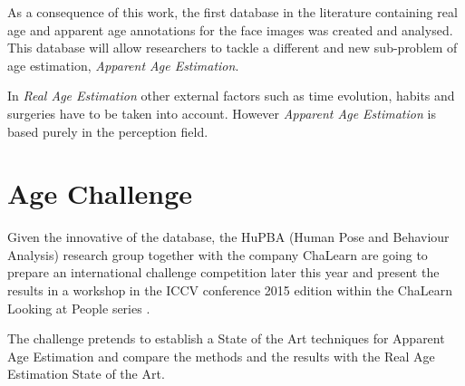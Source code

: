 As a consequence of this work, the first database in the literature containing real age and apparent age annotations for the face images was created and analysed. This database will allow researchers to tackle a different and new sub-problem of age estimation, \textit{Apparent Age Estimation}.

In \textit{Real Age Estimation} other external factors such as time evolution, habits and surgeries have to be taken into account. However \textit{Apparent Age Estimation} is based purely in the perception field.


\section{Age Challenge}

Given the innovative of the database, the HuPBA (Human Pose and Behaviour Analysis) research group \cite{HuPBA} together with the company ChaLearn \cite{ChaLearn} are going to prepare an international challenge competition later this year and present the results in a workshop in the ICCV conference 2015 edition within the ChaLearn Looking at People series \cite{LaP} \cite{SergioEscalera2014} \cite{Escalera:2013:MGR:2522848.2532595} \cite{conf/icmi/EscaleraGBRGAESASBS13}. 

The challenge pretends to establish a State of the Art techniques for Apparent Age Estimation and compare the methods and the results with the Real Age Estimation State of the Art.


